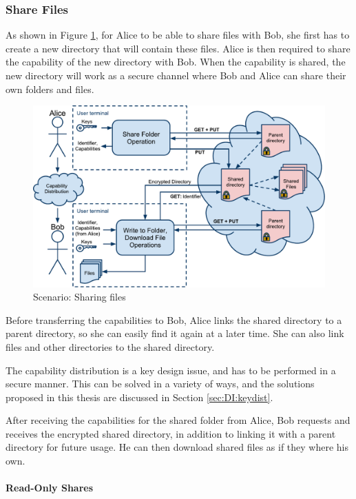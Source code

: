 \documentclass[pdftex,english,10pt,b5paper,twoside]{book}
\begin{document}
\subsubsection{Share Files}

As shown in Figure \ref{fig:AS:sharing}, for Alice to be able to share files
with Bob, she first has to create a new directory that will contain these
files. Alice is then required to share the capability of the new directory with
Bob. When the capability is shared, the new directory will work as a secure
channel where Bob and Alice can share their own folders and files.

\begin{figure}[h!]
    \centering
    \includegraphics[width=\columnwidth]{ArchitectureShare.pdf}
    \caption{Scenario: Sharing files}
    \label{fig:AS:sharing}
\end{figure}

Before transferring the capabilities to Bob, Alice links the shared directory
to a parent directory, so she can easily find it again at a later time. She can
also link files and other directories to the shared directory.

The capability distribution is a key design issue, and has to be performed in a
secure manner. This can be solved in a variety of ways, and the solutions
proposed in this thesis are discussed in Section \ref{sec:DI:keydist}.

After receiving the capabilities for the shared folder from Alice, Bob requests
and receives the encrypted shared directory, in addition to linking it with a
parent directory for future usage. He can then download shared files as if they
where his own.

\paragraph{Read-Only Shares}
\end{document}
